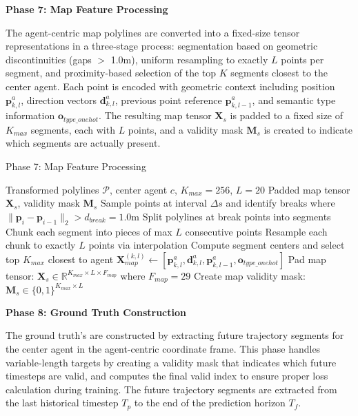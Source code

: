 \textbf{Phase 7: Map Feature Processing}

The agent-centric map polylines are converted into a fixed-size tensor representations in a three-stage process: segmentation based on geometric discontinuities (gaps $>$ 1.0m), uniform resampling to exactly $L$ points per segment, and proximity-based selection of the top $K$ segments closest to the center agent. Each point is encoded with geometric context including position $\boldsymbol{p}_{k,l}^a$, direction vectors $\boldsymbol{d}_{k,l}^a$, previous point reference $\boldsymbol{p}_{k,l-1}^a$, and semantic type information $\boldsymbol{o}_{type\_onehot}$. The resulting map tensor $\boldsymbol{X}_s$ is padded to a fixed size of $K_{max}$ segments, each with $L$ points, and a validity mask $\boldsymbol{M}_s$ is created to indicate which segments are actually present.

\begin{algorithm}[H]
\caption{Phase 7: Map Feature Processing}
\label{alg:phase7_map_features}
\begin{algorithmic}[1]
\REQUIRE Transformed polylines $\mathcal{P}$, center agent $c$, $K_{max} = 256$, $L = 20$
\ENSURE Padded map tensor $\boldsymbol{X}_s$, validity mask $\boldsymbol{M}_s$
\STATE Sample points at interval $\Delta s$ and identify breaks where $\|\boldsymbol{p}_i - \boldsymbol{p}_{i-1}\|_2 > d_{break} = 1.0$m
\STATE Split polylines at break points into segments
\STATE Chunk each segment into pieces of max $L$ consecutive points
\STATE Resample each chunk to exactly $L$ points via interpolation
\STATE Compute segment centers and select top $K_{max}$ closest to agent
    \STATE $\boldsymbol{X}_{map}^{(k,l)} \leftarrow [\boldsymbol{p}_{k,l}^a, \boldsymbol{d}_{k,l}^a, \boldsymbol{p}_{k,l-1}^a, \boldsymbol{o}_{type\_onehot}]$
\ENDFOR
\STATE Pad map tensor: $\boldsymbol{X}_s \in \mathbb{R}^{K_{max} \times L \times F_{map}}$ where $F_{map} = 29$
\STATE Create map validity mask: $\boldsymbol{M}_s \in \{0,1\}^{K_{max} \times L}$
\end{algorithmic}
\end{algorithm}

\textbf{Phase 8: Ground Truth Construction}

The ground truth's are constructed by extracting future trajectory segments for the center agent in the agent-centric coordinate frame. This phase handles variable-length targets by creating a validity mask that indicates which future timesteps are valid, and computes the final valid index to ensure proper loss calculation during training. The future trajectory segments are extracted from the last historical timestep $T_p$ to the end of the prediction horizon $T_f$.

